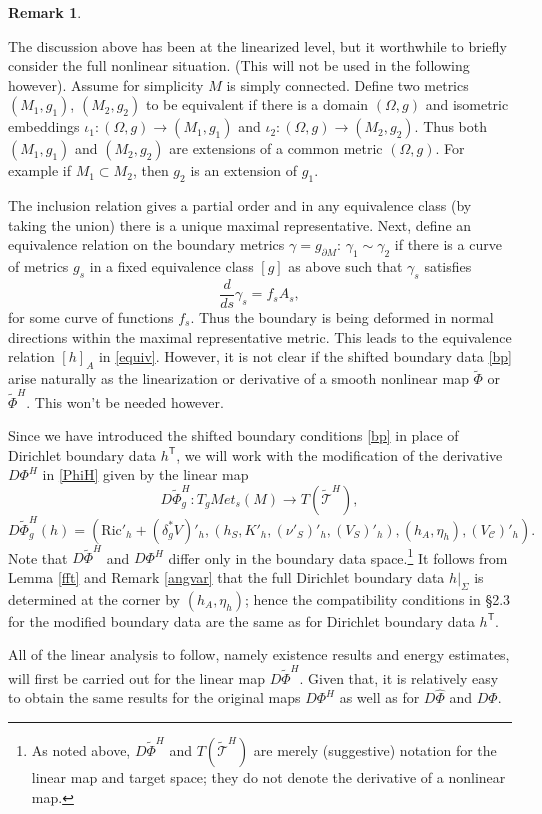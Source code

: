 \documentclass[10pt]{amsart}
\newcommand{\g}{\gamma}
\renewcommand{\d}{\delta}
\newcommand{\Si}{\Sigma}
\renewcommand{\O}{\Omega}
\newcommand{\cC}{{\mathcal C}}
\newcommand{\cT}{{\mathcal T}}
\newcommand{\Ric}{\mathrm{Ric}}
\newcommand{\tT}{\mathsf{T}}
\newcommand{\be}{\begin{equation}}
\newcommand{\ee}{\end{equation}}
\renewcommand{\to}{\rightarrow}
\renewcommand{\hat}{\widehat}
\newcommand{\<}{\langle}
\renewcommand{\>}{\rangle}
\newcommand{\dm}{{\partial M}}
\newcommand{\w}{\widetilde}
\theoremstyle{plain}
\theoremstyle{remark}
\theoremstyle{definition}
\newtheorem{remark}[lemma]{Remark}
\numberwithin{equation}{section}
\begin{document}
\begin{remark} \label{moveC}
{\rm The discussion above has been at the linearized level, but it worthwhile to briefly consider the full nonlinear situation. (This will not be used in the 
following however). Assume for simplicity $M$ is simply connected. Define two metrics $(M_1, g_1)$, $(M_2, g_2)$ to be equivalent if there is a domain 
$(\O, g)$ and isometric embeddings $\iota_1: (\O, g) \to (M_1, g_1)$ and $\iota_2: (\O, g) \to (M_2, g_2)$. Thus both $(M_1, g_1)$ and $(M_2, g_2)$ are 
extensions of a common metric $(\O, g)$. For example if $M_1 \subset M_2$, then $g_2$ is an extension of $g_1$. 

  The inclusion relation gives a partial order and in any equivalence class (by taking the union) there is a unique maximal representative. 
  Next, define an equivalence relation on the boundary metrics $\g = g_{\dm}$: $\g_1 \sim \g_2$ if there is a curve of metrics $g_s$ in a fixed 
equivalence class $[g]$ as above such that $\g_s$ satisfies 
$$\frac{d}{ds}\g_s = f_s A_s,$$
for some curve of functions $f_s$. Thus the boundary is being deformed in normal directions within the maximal representative metric. This leads to the 
equivalence relation $[h]_A$ in \eqref{equiv}. However, it is not clear if the shifted boundary data \eqref{bp} arise naturally as the linearization or derivative of a 
smooth nonlinear map $\w \Phi$ or $\w \Phi^H$. This won't be needed however. 
 }
 \end{remark}
 
 
    Since we have introduced the shifted boundary conditions \eqref{bp} in place of Dirichlet boundary data $h^{\tT}$, we will work with 
the modification of the derivative $D\Phi^H$ in \eqref{PhiH} given by the linear map 
 \be \label{wPhiH}
D\w \Phi_g^H: T_gMet_s(M) \to T( \w \cT^H),
\ee
$$D\w \Phi_g^H(h) = (\Ric'_h + (\d_g^* V)'_h, (h_S, K'_h, (\nu'_S)'_h, (V_S)'_h), (h_A, \eta_h), (V_{\cC})'_h).$$
Note that $D\w \Phi^H$ and $D\Phi^H$ differ only in the boundary data space.\footnote{As noted above, $D\w \Phi^H$ and $T(\w \cT^H)$ are merely (suggestive) 
notation for the linear map and target space; they do not denote the derivative of a nonlinear map.} It follows from Lemma \ref{fft} and Remark \ref{angvar} that 
the full Dirichlet boundary data $h|_{\Si}$ is determined at the corner by $(h_A, \eta_h)$; hence the compatibility conditions in \S 2.3 for the modified boundary 
data are the same as for Dirichlet boundary data $h^{\tT}$. 

   All of the linear analysis to follow, namely existence results and energy estimates, will first be carried out for the linear map $D\w \Phi^H$. Given that, 
 it is relatively easy to obtain the same results for the original maps $D\Phi^H$ as well as for $D\hat \Phi$ and $D\Phi$. 
 
\end{document}
